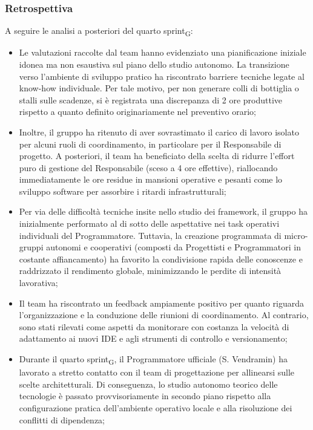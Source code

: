 \documentclass[a4paper, 10pt, colorlinks=true, linkcolor=black, urlcolor=blue, citecolor=blue, hidelinks]{article}
\begin{document}
\subsubsection{Retrospettiva}
A seguire le analisi a posteriori del quarto sprint\textsubscript{G}:
\begin{itemize}
    \item Le valutazioni raccolte dal team hanno evidenziato una pianificazione iniziale idonea ma non esaustiva sul piano dello studio autonomo. La transizione verso l'ambiente di sviluppo pratico ha riscontrato barriere tecniche legate al know-how individuale. Per tale motivo, per non generare colli di bottiglia o stalli sulle scadenze, si è registrata una discrepanza di 2 ore produttive rispetto a quanto definito originariamente nel preventivo orario;
    \item Inoltre, il gruppo ha ritenuto di aver sovrastimato il carico di lavoro isolato per alcuni ruoli di coordinamento, in particolare per il Responsabile di progetto. A posteriori, il team ha beneficiato della scelta di ridurre l'effort puro di gestione del Responsabile (sceso a 4 ore effettive), riallocando immediatamente le ore residue in mansioni operative e pesanti come lo sviluppo software per assorbire i ritardi infrastrutturali;
    \item Per via delle difficoltà tecniche insite nello studio dei framework, il gruppo ha inizialmente performato al di sotto delle aspettative nei task operativi individuali del Programmatore. Tuttavia, la creazione programmata di micro-gruppi autonomi e cooperativi (composti da Progettisti e Programmatori in costante affiancamento) ha favorito la condivisione rapida delle conoscenze e raddrizzato il rendimento globale, minimizzando le perdite di intensità lavorativa;
    \item Il team ha riscontrato un feedback ampiamente positivo per quanto riguarda l'organizzazione e la conduzione delle riunioni di coordinamento. Al contrario, sono stati rilevati come aspetti da monitorare con costanza la velocità di adattamento ai nuovi IDE e agli strumenti di controllo e versionamento;
    \item Durante il quarto sprint\textsubscript{G}, il Programmatore ufficiale (S. Vendramin) ha lavorato a stretto contatto con il team di progettazione per allinearsi sulle scelte architetturali. Di conseguenza, lo studio autonomo teorico delle tecnologie è passato provvisoriamente in secondo piano rispetto alla configurazione pratica dell'ambiente operativo locale e alla risoluzione dei conflitti di dipendenza;

\end{itemize}
\end{document}

